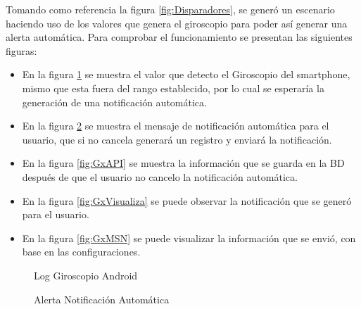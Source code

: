 Tomando como referencia la figura \ref{fig:Disparadores}, se generó un escenario haciendo uso de los valores que genera el giroscopio para poder así generar una alerta automática. Para comprobar el funcionamiento se presentan las siguientes figuras:
\begin{itemize}
	\item En la figura \ref{fig:LogGX} se muestra el valor que detecto el Giroscopio del smartphone, mismo que esta fuera del rango establecido, por lo cual se esperaría la generación de una notificación automática.
	\item En la figura \ref{fig:GxNotifica} se muestra el mensaje de notificación automática para el usuario, que si no cancela generará un registro y enviará la notificación.
	\item En la figura \ref{fig:GxAPI} se muestra la información que se guarda en la BD después de que el usuario no cancelo la notificación automática.
	\item En la figura \ref{fig:GxVisualiza} se puede observar la notificación que se generó para el usuario.
	\item En la figura \ref{fig:GxMSN} se puede visualizar la información que se envió, con base en las configuraciones.
\end{itemize}

\begin{figure}[htbp!]
	\centering
	\caption{Log Giroscopio Android}
	\label{fig:LogGX}
\end{figure}

\begin{figure}[htbp!]
	\centering
	\caption{Alerta Notificación Automática}
	\label{fig:GxNotifica}
\end{figure}

